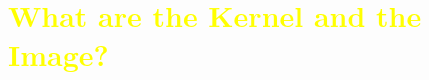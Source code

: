 \documentclass[pdf,9pt]{beamer}
\date{Chapter 7. Linear Transformations \\ \S  7-2. Kernel and Image}
\begin{document}








\begin{frame}[fragile]
   \tableofcontents
\end{frame}
\section[\textcolor{yellow}{}]{\textcolor{yellow}{What are the Kernel and the Image?}}
\end{document}
